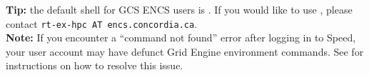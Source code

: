 \noindent \textbf{Tip:} the default shell for GCS ENCS users is .
If you would like to use , please contact \texttt{rt-ex-hpc AT encs.concordia.ca}.\\





%

\noindent\textbf{Note:} If you encounter a ``command not found'' error after logging in to Speed, 
your user account may have defunct Grid Engine environment commands. 
See  for instructions on how to resolve this issue.